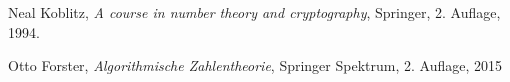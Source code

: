 \documentclass[
  a4paper,
  11pt,
]{scrartcl}
\theoremstyle{plain}
\theoremstyle{definition}
\theoremstyle{remark}
\begin{document}
\begin{thebibliography}{9}
    Neal Koblitz,
    \textit{A course in number theory and cryptography},
    Springer,
    2. Auflage,
    1994.

    Otto Forster,
    \textit{Algorithmische Zahlentheorie},
    Springer Spektrum,
    2. Auflage,
    2015

\end{thebibliography}
\end{document}
